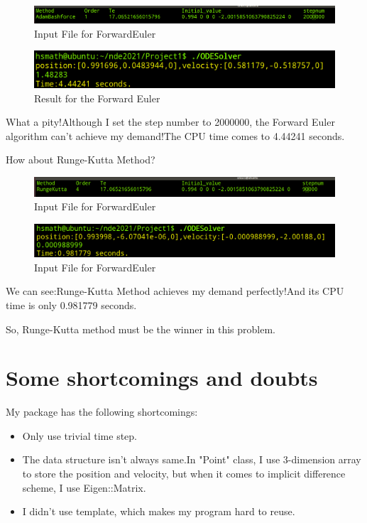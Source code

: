 \documentclass[UTF8]{ctexart}
\theoremstyle{plain}
\theoremstyle{definition}
\theoremstyle{remark}
\begin{document}
\begin{figure}[H]
\centering
\includegraphics[height=0.05\textheight,width=0.9\linewidth]{5}
\caption{Input File for ForwardEuler}
\end{figure}
\begin{figure}[H]
\centering
\includegraphics[height=0.1\textheight,width=0.9\linewidth]{6}
\caption{Result for the Forward Euler}
\end{figure}
What a pity!Although I set the step number to 2000000, the Forward Euler algorithm can't achieve my demand!The CPU time comes to 4.44241 seconds.

How about Runge-Kutta Method?
\begin{figure}[H]
\centering
\includegraphics[height=0.05\textheight,width=0.9\linewidth]{7}
\caption{Input File for ForwardEuler}
\end{figure}
\begin{figure}[H]
\centering
\includegraphics[height=0.1\textheight,width=0.9\linewidth]{8}
\caption{Input File for ForwardEuler}
\end{figure}

We can see:Runge-Kutta Method achieves my demand perfectly!And its CPU time is only 0.981779 seconds.

So, Runge-Kutta method must be the winner in this problem.

\section{Some shortcomings and doubts}
My package has the following shortcomings:
\begin{itemize}
\item Only use trivial time step.
\item The data structure isn't always same.In "Point" class, I use 3-dimension array to store the position and velocity, but when it comes to implicit difference scheme, I use Eigen::Matrix.
\item I didn't use template, which makes my program hard to reuse.
\end{itemize}
\end{document}

